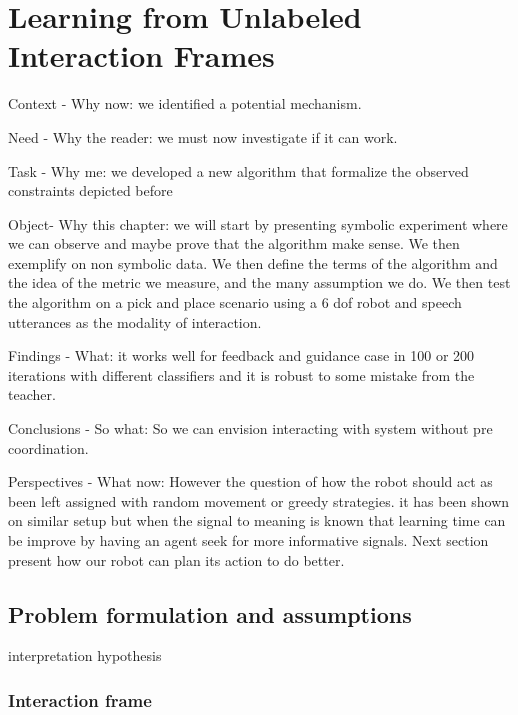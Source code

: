 \renewcommand{\chapterpath}{\allchapterspath/lfui}
\renewcommand{\imgpath}{\chapterpath/img}

\chapter{Learning from Unlabeled Interaction Frames}
\label{chapter:lfui}
\minitoc

Context - Why now: we identified a potential mechanism.

Need - Why the reader: we must now investigate if it can work.

Task - Why me: we developed a new algorithm that formalize the observed constraints depicted before

Object- Why this chapter:  we will start by presenting symbolic experiment where we can observe and maybe prove that the algorithm make sense. We then exemplify on non symbolic data. We then define the terms of the algorithm and the idea of the metric we measure, and the many assumption we do. We then test the algorithm on a pick and place scenario using a 6 dof robot and speech utterances as the modality of interaction.

Findings - What: it works well for feedback and guidance case in 100 or 200 iterations with different classifiers and it is robust to some mistake from the teacher.

Conclusions - So what: So we can envision interacting with system without pre coordination. 

Perspectives - What now: However the question of how the robot should act as been left assigned with random movement or greedy strategies. it has been shown on similar setup but when the signal to meaning is known that learning time can be improve by having an agent seek for more informative signals. Next section present how our robot can plan its action to do better.

\section{Problem formulation and assumptions}

interpretation hypothesis

\subsection{Interaction frame}

